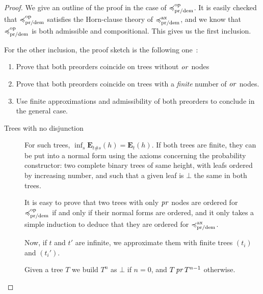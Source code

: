 \begin{proof}
    We give an outline of the proof in the case of $\preccurlyeq^{\text{op}}_{\text{pr/dem}}$.
    It is easily checked that $\preccurlyeq^{\text{op}}_{\text{pr/dem}}$ satisfies the Horn-clause
    theory of $\preccurlyeq^{\text{ax}}_{\text{pr/dem}}$, and we know that $\preccurlyeq^{\text{op}}_{\text{pr/dem}}$ is 
    both admissible and compositional. This gives us the first inclusion.
    
    For the other inclusion, the proof sketch is the following one~:
    \begin{enumerate}
        \item Prove that both preorders coincide 
            on trees without $\operatorname{\mathit{or}}$ nodes
        \item Prove that both preorders coincide 
            on trees with a \emph{finite} number 
            of $\operatorname{\mathit{or}}$ nodes.
        \item Use finite approximations and admissibility
            of both preorders to conclude in the general case.
    \end{enumerate}

    \begin{description}
        \item[Trees with no disjunction]


    For such trees, $\inf_s \mathbf{E}_{ t \# s } (h)
    = \mathbf{E}_{ t } (h)$.
    If both trees are finite, they can be put into 
    a normal form using the axioms concerning the 
    probability constructor: two complete binary trees 
    of same height,
    with leafs ordered by increasing number, and 
    such that a given leaf is $\bot$ the same 
    in both trees.

    It is easy to prove that two trees with 
    only $\operatorname{\mathit{pr}}$ nodes are ordered for $\preccurlyeq^{\text{op}}_{\text{pr/dem}}$
    if and only if their normal forms are ordered,
    and it only takes a simple induction to 
    deduce that they are ordered for $\preccurlyeq^{\text{ax}}_{\text{pr/dem}}$.

    Now, if $t$ and $t'$ are infinite, 
    we approximate them with finite trees $(t_i)$ and 
    $(t_i')$.
    
    Given a tree $T$ we build $T^n$ as $\bot$ if $n = 0$, and $T \operatorname{\mathit{pr}} T^{n-1}$
    otherwise. 


\end{description}
\end{proof}
